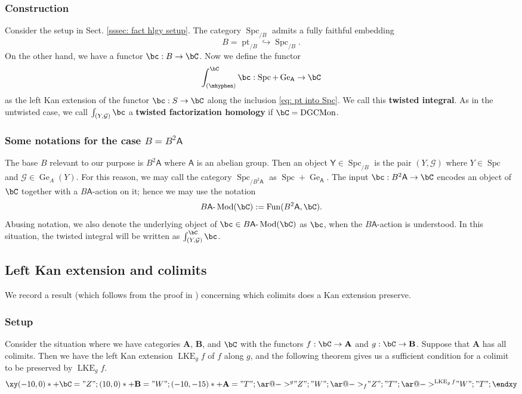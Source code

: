 \documentclass[10pt]{amsart}
\newcommand{\sssec}{\subsubsection}
\theoremstyle{remark}
\newcommand{\on}{\operatorname}
\newcommand{\cG}{\mathcal{G}}
\newcommand{\DGCatSymMon}{\on{DGCMon}}
\newcommand{\lMod}{\text{-}\on{Mod}}
\newcommand{\Spc}{\on{Spc}}
\newcommand{\Fun}{\on{Fun}}
\newcommand{\bA}{\mathbf{A}}
\newcommand{\bB}{\mathbf{B}}
\newcommand{\pt}{\on{pt}}
\newcommand{\sfA}{\mathsf{A}}
\newcommand{\sfY}{\mathsf{Y}}
\begin{document}
\sssec{Construction}
Consider the setup in Sect. \ref{sssec: fact hlgy setup}.
The category $\Spc_{/B}$ admits a fully faithful embedding
\begin{equation}\label{eq: pt into Spc}
    B= \pt_{/B}\hookrightarrow \Spc_{/B}.
\end{equation}
On the other hand, we have a functor $\bc:B\rightarrow\bC$.
Now we define the functor
\begin{equation}\label{eq: twisted factorization homology}
    \int^{\bC}_{(\mhyphen)}\bc: \Spc+\on{Ge}_{\sfA}\rightarrow \bC
\end{equation}
as the left Kan extension of the functor $\bc: S\rightarrow\bC$ along the inclusion \eqref{eq: pt into Spc}. We call this \textbf{twisted integral}. As in the untwisted case, we call $\int_{(Y,\cG)} \bc$ a \textbf{twisted factorization homology} if $\bC=\DGCatSymMon$.

\sssec{Some notations for the case $B=B^2\sfA$}\label{sssec: B being B2A}
    The base $B$ relevant to our purpose is $B^2\sfA$ where $\sfA$ is an abelian group. Then an object $\sfY\in \Spc_{/B}$ is the pair $(Y,\cG)$ where $Y\in\Spc$ and $\cG\in\on{Ge}_A(Y)$. For this reason, we may call the category $\Spc_{/B^2\sfA}$ as $\Spc+\on{Ge}_{\sfA}$. The input $\bc:B^2\sfA\rightarrow \bC$ encodes an object of $\bC$ together with a $B\sfA$-action on it; hence we may use the notation \[B\sfA\lMod(\bC):=\Fun(B^2\sfA,\bC).\] Abusing notation, we also denote the underlying object of $\bc\in B\sfA\lMod(\bC)$ as $\bc$, when the $B\sfA$-action is understood. In this situation, the twisted integral will be written as $\int^{\bC}_{(Y,\cG)}\bc$.


\subsection{Left Kan extension and colimits}
We record a result (which follows from the proof in \cite{MORezk}) concerning which colimits does a Kan extension preserve.

\sssec{Setup}
Consider the situation where we have categories $\bA$, $\bB$, and $\bC$ with the functors $f:\bC\rightarrow \bA$ and $g:\bC\rightarrow \bB$. Suppose that $\bA$ has all colimits. Then we have the left Kan extension $\on{LKE}_g f$ of $f$ along $g$, and the following theorem gives us a sufficient condition for a colimit to be preserved by $\on{LKE}_g f$.
\begin{gather*}  
\xy
(-10,0)*+{\bC}="Z";
(10,0)*+{\bB}="W";
(-10,-15)*+{\bA}="T";
{\ar@{->}^{g}"Z";"W"};
{\ar@{->}_{f}"Z";"T"};
{\ar@{->}^{\on{LKE}_g f}"W";"T"};
\endxy
\end{gather*}
\end{document}
